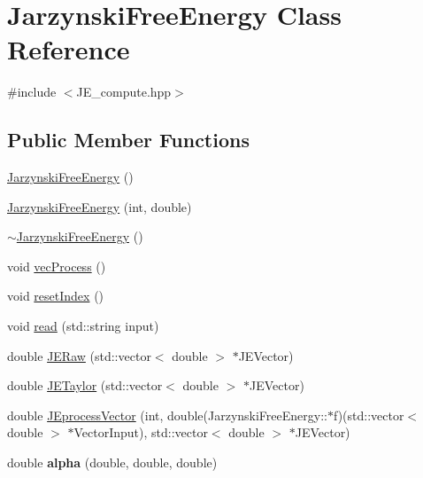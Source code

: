 \hypertarget{classJarzynskiFreeEnergy}{}\section{Jarzynski\+Free\+Energy Class Reference}
\label{classJarzynskiFreeEnergy}


{\ttfamily \#include $<$J\+E\+\_\+compute.\+hpp$>$}

\subsection*{Public Member Functions}
\begin{DoxyCompactItemize}
\item 
\hyperlink{classJarzynskiFreeEnergy_a9dc75fdb48425a3ca7323c83788c696b}{Jarzynski\+Free\+Energy} ()
\item 
\hyperlink{classJarzynskiFreeEnergy_a6d7cc9d290833e8e494695add4691f79}{Jarzynski\+Free\+Energy} (int, double)
\item 
\hyperlink{classJarzynskiFreeEnergy_ac7caddec7e67ac8a7f22854de1c39619}{$\sim$\+Jarzynski\+Free\+Energy} ()
\item 
void \hyperlink{classJarzynskiFreeEnergy_a7765d4e262c6705461d9eb9e1ac0f502}{vec\+Process} ()
\item 
void \hyperlink{classJarzynskiFreeEnergy_a0488e0cac955936c16405ff5ec8de5c1}{reset\+Index} ()
\item 
void \hyperlink{classJarzynskiFreeEnergy_a4d6391b365eee3e95932b9166320dc70}{read} (std\+::string input)
\item 
double \hyperlink{classJarzynskiFreeEnergy_afadb2d232cfc8d15eb03aff7a5f0a56d}{J\+E\+Raw} (std\+::vector$<$ double $>$ $\ast$J\+E\+Vector)
\item 
double \hyperlink{classJarzynskiFreeEnergy_ab6cbfd29bad121a95411758c00f07b8f}{J\+E\+Taylor} (std\+::vector$<$ double $>$ $\ast$J\+E\+Vector)
\item 
double \hyperlink{classJarzynskiFreeEnergy_a08c0fc232cb17af249320c14a6c6d75e}{J\+Eprocess\+Vector} (int, double(Jarzynski\+Free\+Energy\+::$\ast$f)(std\+::vector$<$ double $>$ $\ast$Vector\+Input), std\+::vector$<$ double $>$ $\ast$J\+E\+Vector)
\item 
\mbox{\label{classJarzynskiFreeEnergy_a6f37399a471ad364a4eba666915dbfca}} 
double {\bfseries alpha} (double, double, double)
\end{DoxyCompactItemize}



